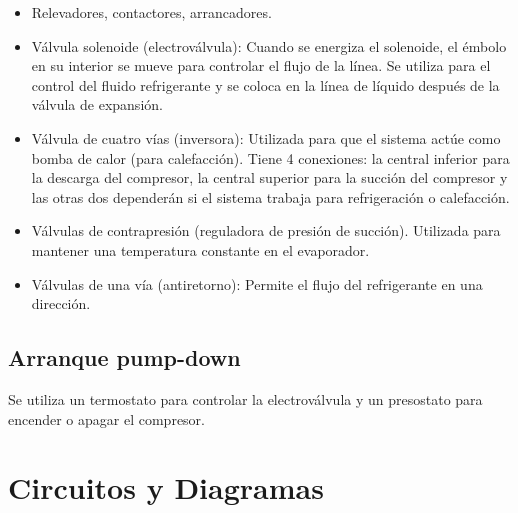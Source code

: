 \begin{itemize}
    \item Relevadores, contactores, arrancadores.
    \item Válvula solenoide (electroválvula): Cuando se energiza el solenoide, el émbolo en su interior se mueve para controlar el flujo de la línea. Se utiliza para el control del fluido refrigerante y se coloca en la línea de líquido después de la válvula de expansión.
    \item Válvula de cuatro vías (inversora): Utilizada para que el sistema actúe como bomba de calor (para calefacción). Tiene 4 conexiones: la central inferior para la descarga del compresor, la central superior para la succión del compresor y las otras dos dependerán si el sistema trabaja para refrigeración o calefacción.
    \item Válvulas de contrapresión (reguladora de presión de succión). Utilizada para mantener una temperatura constante en el evaporador.
    \item Válvulas de una vía (antiretorno): Permite el flujo del refrigerante en una dirección.
\end{itemize}

\subsection{Arranque pump-down}

Se utiliza un termostato para controlar la electroválvula y un presostato para encender o apagar el compresor.

\section{Circuitos y Diagramas}

